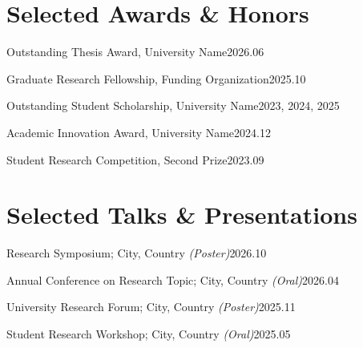 \documentclass[a4paper,10pt]{article}
\begin{document}
\section*{Selected Awards \& Honors}
Outstanding Thesis Award, University Name\hfill 2026.06\par
Graduate Research Fellowship, Funding Organization\hfill 2025.10\par
Outstanding Student Scholarship, University Name\hfill 2023, 2024, 2025\par
Academic Innovation Award, University Name\hfill 2024.12\par
Student Research Competition, Second Prize\hfill 2023.09\par

\section*{Selected Talks \& Presentations}
Research Symposium; City, Country \textit{(Poster)}\hfill 2026.10\par
Annual Conference on Research Topic; City, Country \textit{(Oral)}\hfill 2026.04\par
University Research Forum; City, Country \textit{(Poster)}\hfill 2025.11\par
Student Research Workshop; City, Country \textit{(Oral)}\hfill 2025.05\par
\end{document}
